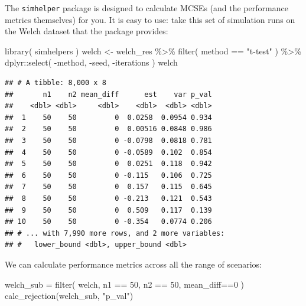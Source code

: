 \documentclass[
]{book}
\newenvironment{Shaded}{\begin{snugshade}}{\end{snugshade}}
\newcommand{\DecValTok}[1]{\textcolor[rgb]{0.00,0.00,0.81}{#1}}
\newcommand{\FunctionTok}[1]{\textcolor[rgb]{0.00,0.00,0.00}{#1}}
\newcommand{\NormalTok}[1]{#1}
\newcommand{\OtherTok}[1]{\textcolor[rgb]{0.56,0.35,0.01}{#1}}
\newcommand{\SpecialCharTok}[1]{\textcolor[rgb]{0.00,0.00,0.00}{#1}}
\newcommand{\StringTok}[1]{\textcolor[rgb]{0.31,0.60,0.02}{#1}}
\begin{document}
The \texttt{simhelper} package is designed to calculate MCSEs (and the performance metrics themselves) for you.
It is easy to use: take this set of simulation runs on the Welch dataset that the package provides:

\begin{Shaded}
\begin{Highlighting}[]
\FunctionTok{library}\NormalTok{( simhelpers )}
\NormalTok{welch }\OtherTok{\textless{}{-}}\NormalTok{ welch\_res }\SpecialCharTok{\%\textgreater{}\%}
  \FunctionTok{filter}\NormalTok{( method }\SpecialCharTok{==} \StringTok{"t{-}test"}\NormalTok{ ) }\SpecialCharTok{\%\textgreater{}\%}
\NormalTok{  dplyr}\SpecialCharTok{::}\FunctionTok{select}\NormalTok{( }\SpecialCharTok{{-}}\NormalTok{method, }\SpecialCharTok{{-}}\NormalTok{seed, }\SpecialCharTok{{-}}\NormalTok{iterations )}
\NormalTok{welch}
\end{Highlighting}
\end{Shaded}

\begin{verbatim}
## # A tibble: 8,000 x 8
##       n1    n2 mean_diff      est    var p_val
##    <dbl> <dbl>     <dbl>    <dbl>  <dbl> <dbl>
##  1    50    50         0  0.0258  0.0954 0.934
##  2    50    50         0  0.00516 0.0848 0.986
##  3    50    50         0 -0.0798  0.0818 0.781
##  4    50    50         0 -0.0589  0.102  0.854
##  5    50    50         0  0.0251  0.118  0.942
##  6    50    50         0 -0.115   0.106  0.725
##  7    50    50         0  0.157   0.115  0.645
##  8    50    50         0 -0.213   0.121  0.543
##  9    50    50         0  0.509   0.117  0.139
## 10    50    50         0 -0.354   0.0774 0.206
## # ... with 7,990 more rows, and 2 more variables:
## #   lower_bound <dbl>, upper_bound <dbl>
\end{verbatim}

We can calculate performance metrics across all the range of scenarios:

\begin{Shaded}
\begin{Highlighting}[]
\NormalTok{welch\_sub }\OtherTok{=} \FunctionTok{filter}\NormalTok{( welch, n1 }\SpecialCharTok{==} \DecValTok{50}\NormalTok{, n2 }\SpecialCharTok{==} \DecValTok{50}\NormalTok{, mean\_diff}\SpecialCharTok{==}\DecValTok{0}\NormalTok{ )}
\FunctionTok{calc\_rejection}\NormalTok{(welch\_sub, }\StringTok{"p\_val"}\NormalTok{)}
\end{Highlighting}
\end{Shaded}
\end{document}
